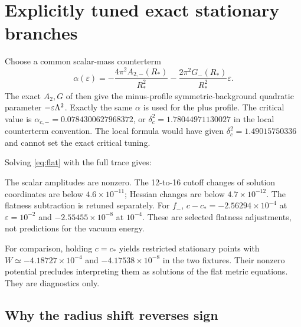 \documentclass[11pt,letterpaper]{article}
\begin{document}
\section{Explicitly tuned exact stationary branches}

Choose a common scalar-mass counterterm
\begin{equation}
 \alpha(\varepsilon)=-\frac{4\pi^2A_{2,-}(R_*)}{R_*^2}
                    -\frac{2\pi^2G_-(R_*)}{R_*^2}\varepsilon.
 \label{eq:tuning}
\end{equation}
The exact $A_2,G$ of \cite{exact} then give the minus-profile symmetric-background quadratic parameter $-\varepsilon\Lambda^2$. Exactly the same $\alpha$ is used for the plus profile. The critical value is $\alpha_{c,-}=0.0784300627968372$, or $\delta_c^2=1.78044971130027$ in the local counterterm convention. The local formula would have given $\delta_c^2=1.49015750336$ and cannot set the exact critical tuning.

\begin{samepage}
Solving \eqref{eq:flat} with the full trace gives:
\begin{center}\small\VacuumTable\end{center}
\end{samepage}
The scalar amplitudes are nonzero. The 12-to-16 cutoff changes of solution coordinates are below $4.6\times10^{-11}$; Hessian changes are below $4.7\times10^{-12}$. The flatness subtraction is retuned separately. For $f_-$, $c-c_*=-2.56294\times10^{-4}$ at $\varepsilon=10^{-2}$ and $-2.55455\times10^{-8}$ at $10^{-4}$. These are selected flatness adjustments, not predictions for the vacuum energy.

For comparison, holding $c=c_*$ yields restricted stationary points with $W\simeq-4.18727\times10^{-4}$ and $-4.17538\times10^{-8}$ in the two fixtures. Their nonzero potential precludes interpreting them as solutions of the flat metric equations. They are diagnostics only.

\subsection{Why the radius shift reverses sign}
\end{document}
